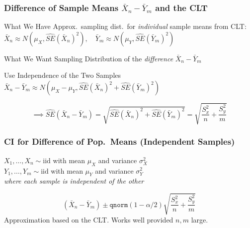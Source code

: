 \begin{frame}
\frametitle{Difference of Sample Means $\bar{X}_n-\bar{Y}_m$ and the CLT}
\begin{block}{What We Have}
Approx.\ sampling dist.\ for \emph{individual}  sample means from CLT:
\alert{$\bar{X}_n\approx N\left(\mu_X, \widehat{SE}(\bar{X}_n)^2\right), \quad \bar{Y}_m\approx N\left(\mu_Y, \widehat{SE}(\bar{Y}_m)^2\right)$}
\end{block}

\begin{block}{What We Want}
Sampling Distribution of the \emph{difference} $\bar{X}_n - \bar{Y}_m$
\end{block}

\begin{block}{Use Independence of the Two Samples}
\alert{$\bar{X}_n - \bar{Y}_m\approx N\left( \mu_X - \mu_Y, \widehat{SE}(\bar{X}_n)^2 +\widehat{SE}(\bar{Y}_m)^2\right)$}



$$\implies \widehat{SE}(\bar{X}_n - \bar{Y}_m) =  \sqrt{\widehat{SE}(\bar{X}_n)^2 +\widehat{SE}(\bar{Y}_m)^2}  = \sqrt{\displaystyle\frac{S_x^2}{n} + \frac{S_y^2}{m} }$$
\end{block}

\end{frame}
\begin{frame}
\frametitle{CI for Difference of Pop.\ Means (Independent Samples)}

$X_1, \hdots, X_n \sim \mbox{iid}$ with mean $\mu_X$ and variance $\sigma_X^2$\\ $Y_1, \hdots, Y_m \sim \mbox{iid}$ with mean $\mu_Y$ and variance $\sigma_Y^2$\\
\emph{where each sample is independent of the other } 


	$$\left(\bar{X}_n - \bar{Y}_m\right) \pm \texttt{qnorm}(1-\alpha/2) \sqrt{\frac{S_x^2}{n} + \frac{S_y^2}{m}}$$
	\alert{Approximation based on the CLT. Works well provided $n,m$ large.}
\end{frame}


